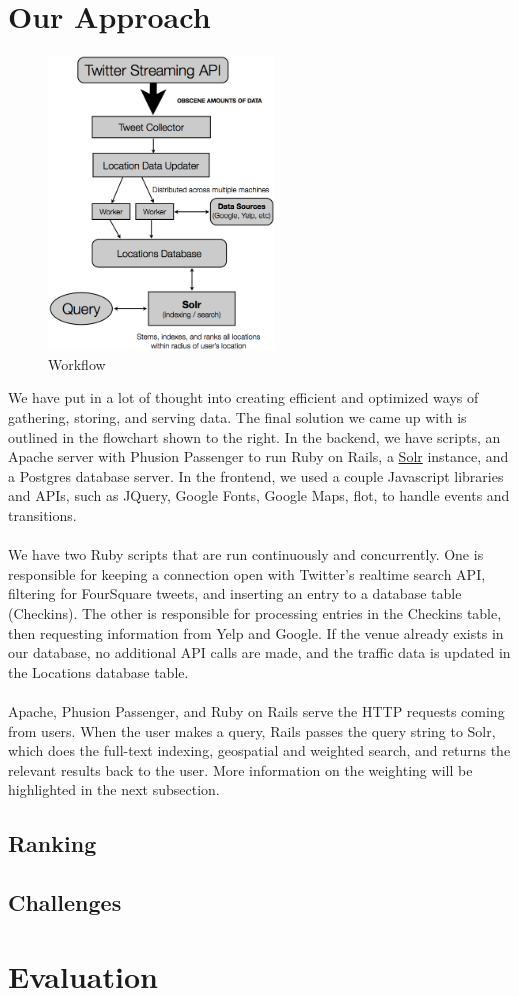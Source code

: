 \documentclass{article}
\begin{document}
\section{Our Approach}
\begin{figure}
\includegraphics[width=6cm]{flowchart.png}
\caption{Workflow}
\end{figure}
We have put in a lot of thought into creating efficient and optimized ways of gathering, storing, and serving data. The final solution
we came up with is outlined in the flowchart shown to the right. In the backend, we have scripts, an Apache server with Phusion Passenger
to run Ruby on Rails, a \href{http://lucene.apache.org/solr/}{Solr} instance, and a Postgres database server. In the frontend, we used
a couple Javascript libraries and APIs, such as JQuery, Google Fonts, Google Maps, flot, to handle events and transitions. 
\\ \\
We have two Ruby scripts that are run continuously and concurrently. One is responsible for keeping a connection open with Twitter's realtime
search API, filtering for FourSquare tweets, and inserting an entry to a database table (Checkins). The other is responsible for processing
entries in the Checkins table, then requesting information from Yelp and Google. If the venue already exists in our database, no additional
API calls are made, and the traffic data is updated in the Locations database table. 
\\ \\
Apache, Phusion Passenger, and Ruby on Rails serve the HTTP requests coming from users. When the user makes a query, Rails passes the query
string to Solr, which does the full-text indexing, geospatial and weighted search, and returns the relevant results back to the user.
More information on the weighting will be highlighted in the next subsection.

\subsection{Ranking}
\subsection{Challenges}

\section{Evaluation}
\end{document}
